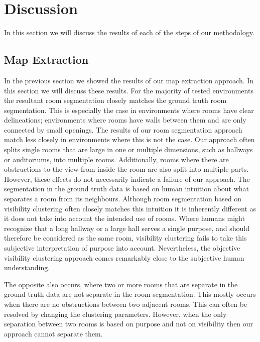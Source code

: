 \section{Discussion}
In this section we will discuss the results of each of the steps of our methodology.

\subsection{Map Extraction}
\label{section:map_extraction}
In the previous section we showed the results of our map extraction approach. In this section we will discuss these results. For the majority of tested environments the resultant room segmentation closely matches the ground truth room segmentation. This is especially the case in environments where rooms have clear delineations; environments where rooms have walls between them and are only connected by small openings. The results of our room segmentation approach match less closely in environments where this is not the case. Our approach often splits single rooms that are large in one or multiple dimensions, such as hallways or auditoriums, into multiple rooms. Additionally, rooms where there are obstructions to the view from inside the room are also split into multiple parts. However, these effects do not necessarily indicate a failure of our approach. The segmentation in the ground truth data is based on human intuition about what separates a room from its neighbours. Although room segmentation based on visibility clustering often closely matches this intuition it is inherently different as it does not take into account the intended use of rooms. Where humans might recognize that a long hallway or a large hall serves a single purpose, and should therefore be considered as the same room, visibility clustering fails to take this subjective interpretation of purpose into account. Nevertheless, the objective visibility clustering approach comes remarkably close to the subjective human understanding. 

The opposite also occurs, where two or more rooms that are separate in the ground truth data are not separate in the room segmentation. This mostly occurs when there are no obstructions between two adjacent rooms. This can often be resolved by changing the clustering parameters. However, when the only separation between two rooms is based on purpose and not on visibility then our approach cannot separate them.

